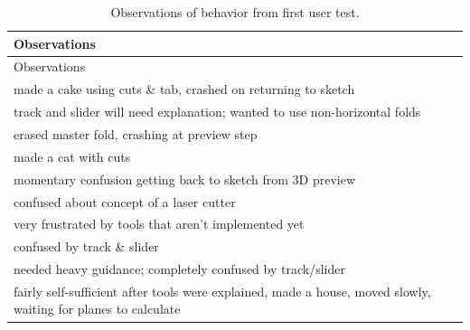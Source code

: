 \begin{longtable}[c]{@{}l@{}}
\caption{Observations of behavior from first user test.}\tabularnewline
\toprule
\begin{minipage}[b]{0.82\columnwidth}\raggedright\strut
Observations
\strut\end{minipage}\tabularnewline
\midrule
\endfirsthead
\toprule
\begin{minipage}[b]{0.82\columnwidth}\raggedright\strut
Observations
\strut\end{minipage}\tabularnewline
\midrule
\endhead
\begin{minipage}[t]{0.82\columnwidth}\raggedright\strut
made a cake using cuts \& tab, crashed on returning to sketch
\strut\end{minipage}\tabularnewline
\begin{minipage}[t]{0.82\columnwidth}\raggedright\strut
track and slider will need explanation; wanted to use non-horizontal
folds
\strut\end{minipage}\tabularnewline
\begin{minipage}[t]{0.82\columnwidth}\raggedright\strut
erased master fold, crashing at preview step
\strut\end{minipage}\tabularnewline
\begin{minipage}[t]{0.82\columnwidth}\raggedright\strut
made a cat with cuts
\strut\end{minipage}\tabularnewline
\begin{minipage}[t]{0.82\columnwidth}\raggedright\strut
momentary confusion getting back to sketch from 3D preview
\strut\end{minipage}\tabularnewline
\begin{minipage}[t]{0.82\columnwidth}\raggedright\strut
confused about concept of a laser cutter
\strut\end{minipage}\tabularnewline
\begin{minipage}[t]{0.82\columnwidth}\raggedright\strut
very frustrated by tools that aren't implemented yet
\strut\end{minipage}\tabularnewline
\begin{minipage}[t]{0.82\columnwidth}\raggedright\strut
confused by track \& slider
\strut\end{minipage}\tabularnewline
\begin{minipage}[t]{0.82\columnwidth}\raggedright\strut
needed heavy guidance; completely confused by track/slider
\strut\end{minipage}\tabularnewline
\begin{minipage}[t]{0.82\columnwidth}\raggedright\strut
fairly self-sufficient after tools were explained, made a house, moved
slowly, waiting for planes to calculate
\strut\end{minipage}\tabularnewline
\bottomrule
\end{longtable}

